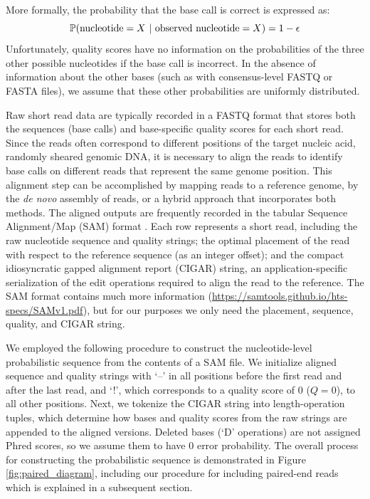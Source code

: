 \documentclass[12pt]{article}
\begin{document}
More formally, the probability that the base call is correct is expressed as: 
\begin{equation}
\label{eq:basecall}
\mathbb{P}(\text{nucleotide}=X \,\,|\,\, \text{observed nucleotide} = X) = 1 - \epsilon
\end{equation}
Unfortunately, quality scores have no information on the probabilities of the three other possible nucleotides if the base call is incorrect.
In the absence of information about the other bases (such as with consensus-level FASTQ or FASTA files), we assume that these other probabilities are uniformly distributed.


Raw short read data are typically recorded in a FASTQ format that stores both the sequences (base calls) and base-specific quality scores for each short read.
Since the reads often correspond to different positions of the target nucleic acid, \eg randomly sheared genomic DNA, it is necessary to align the reads to identify base calls on different reads that represent the same genome position.
This alignment step can be accomplished by mapping reads to a reference genome, by the \emph{de novo} assembly of reads, or a hybrid approach that incorporates both methods.
The aligned outputs are frequently recorded in the tabular Sequence Alignment/Map (SAM) format \citep{liSequenceAlignmentMap2009}.
Each row represents a short read, including the raw nucleotide sequence and quality strings; the optimal placement of the read with respect to the reference sequence (as an integer offset); and the compact idiosyncratic gapped alignment report (CIGAR) string, an application-specific serialization of the edit operations required to align the read to the reference.
The SAM format contains much more information (\url{https://samtools.github.io/hts-specs/SAMv1.pdf}), but for our purposes we only need the placement, sequence, quality, and CIGAR string.


We employed the following procedure to construct the nucleotide-level probabilistic sequence from the contents of a SAM file.
We initialize aligned sequence and quality strings with `--' in all positions before the first read and after the last read, and `!', which corresponds to a quality score of 0 ($Q=0$), to all other positions.
Next, we tokenize the CIGAR string into length-operation tuples, which determine how bases and quality scores from the raw strings are appended to the aligned versions.
Deleted bases (`D' operations) are not assigned Phred scores, so we assume them to have 0 error probability.
The overall process for constructing the probabilistic sequence is demonstrated in Figure \ref{fig:paired_diagram}, including our procedure for including paired-end reads which is explained in a subsequent section.
\end{document}
